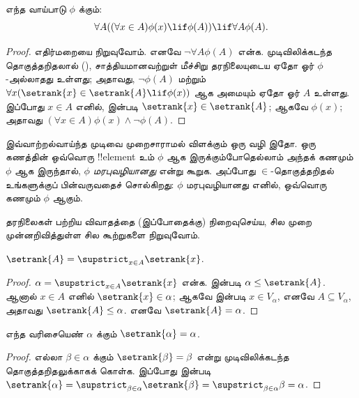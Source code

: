 \documentclass[../../../include/open-logic-section]{subfiles}
\begin{document}
\begin{thm}[$\in$-தொகுத்தறிதல் திட்டம்]
எந்த வாய்பாடு $\phi$ க்கும்:
\[
	\forall A((\forall x \in A)\phi(x) \lif \phi(A)) \lif \forall A \phi(A).
\]
\end{thm}

\begin{proof}
எதிர்மறையை நிறுவுவோம். எனவே $\lnot \forall A \phi(A)$ என்க.
முடிவிலிக்கடந்த தொகுத்தறிதலால்
(), சாத்தியமானவற்றுள்
மீச்சிறு தரநிலையுடைய ஏதோ ஓர் $\phi$-அல்லாதது உள்ளது; அதாவது,
$\lnot \phi(A)$ மற்றும் $\forall x(\setrank{x} \in \setrank{A}
\lif \phi(x))$ ஆக அமையும் ஏதோ ஓர் $A$ உள்ளது. இப்போது $x \in A$
எனில்,  இன்படி $\setrank{x} \in
\setrank{A}$; ஆகவே $\phi(x)$; அதாவது $(\forall x \in A)\phi(x)
\land \lnot \phi(A)$.
\end{proof}\noindent
இவ்வாற்றல்வாய்ந்த முடிவை முறைசாராமல் விளக்கும் ஒரு வழி இதோ. ஒரு கணத்தின்
ஒவ்வொரு !!{element} உம் $\phi$ ஆக இருக்கும்போதெல்லாம் அந்தக் கணமும்
$\phi$ ஆக இருந்தால், $\phi$ \emph{மரபுவழியானது} என்று கூறுக. அப்போது
$\in$-தொகுத்தறிதல் உங்களுக்குப் பின்வருவதைச் சொல்கிறது: $\phi$
மரபுவழியானது எனில், ஒவ்வொரு கணமும் $\phi$ ஆகும்.

தரநிலைகள் பற்றிய விவாதத்தை (இப்போதைக்கு) நிறைவுசெய்ய, சில முறை
முன்னறிவித்துள்ள சில கூற்றுகளை நிறுவுவோம்.

\begin{prop}
$\setrank{A} = \supstrict_{x \in A}\setrank{x}$.
\end{prop}

\begin{proof}
$\alpha = \supstrict_{x \in A}\setrank{x}$ என்க.
 இன்படி $\alpha \leq \setrank{A}$. ஆனால்
$x \in A$ எனில் $\setrank{x} \in \alpha$; ஆகவே
 இன்படி $x \in V_\alpha$, எனவே
$A \subseteq V_\alpha$, அதாவது $\setrank{A} \leq \alpha$.
எனவே $\setrank{A} = \alpha$.
\end{proof}

\begin{cor}
எந்த வரிசையெண் $\alpha$ க்கும் $\setrank{\alpha} = \alpha$.
\end{cor}

\begin{proof}
எல்லா $\beta \in \alpha$ க்கும் $\setrank{\beta} = \beta$ என்று
முடிவிலிக்கடந்த தொகுத்தறிதலுக்காகக் கொள்க. இப்போது
 இன்படி $\setrank{\alpha} =
\supstrict_{\beta \in \alpha}\setrank{\beta} =
\supstrict_{\beta \in \alpha}\beta = \alpha$.
%
\end{proof}
\end{document}
